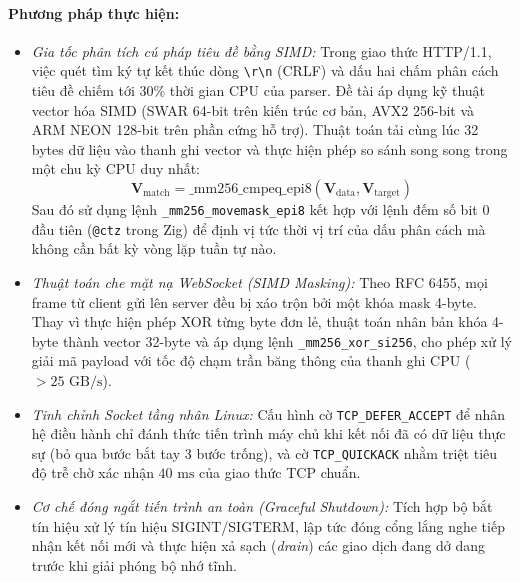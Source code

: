 \documentclass[letterpaper]{article}
\begin{document}
\paragraph{Phương pháp thực hiện:}
\begin{itemize}
    \item \textit{Gia tốc phân tích cú pháp tiêu đề bằng SIMD:} Trong giao thức HTTP/1.1, việc quét tìm ký tự kết thúc dòng \texttt{\textbackslash r\textbackslash n} (CRLF) và dấu hai chấm phân cách tiêu đề chiếm tới 30\% thời gian CPU của parser. Đề tài áp dụng kỹ thuật vector hóa SIMD (SWAR 64-bit trên kiến trúc cơ bản, AVX2 256-bit và ARM NEON 128-bit trên phần cứng hỗ trợ). Thuật toán tải cùng lúc 32 bytes dữ liệu vào thanh ghi vector và thực hiện phép so sánh song song trong một chu kỳ CPU duy nhất:
    \begin{equation}
        \mathbf{V}_{\text{match}} = \text{\_mm256\_cmpeq\_epi8}(\mathbf{V}_{\text{data}}, \mathbf{V}_{\text{target}})
    \end{equation}
    Sau đó sử dụng lệnh \texttt{\_mm256\_movemask\_epi8} kết hợp với lệnh đếm số bit 0 đầu tiên (\texttt{@ctz} trong Zig) để định vị tức thời vị trí của dấu phân cách mà không cần bất kỳ vòng lặp tuần tự nào.
    \item \textit{Thuật toán che mặt nạ WebSocket (SIMD Masking):} Theo RFC 6455, mọi frame từ client gửi lên server đều bị xáo trộn bởi một khóa mask 4-byte. Thay vì thực hiện phép XOR từng byte đơn lẻ, thuật toán nhân bản khóa 4-byte thành vector 32-byte và áp dụng lệnh \texttt{\_mm256\_xor\_si256}, cho phép xử lý giải mã payload với tốc độ chạm trần băng thông của thanh ghi CPU ($> 25\text{ GB/s}$).
    \item \textit{Tinh chỉnh Socket tầng nhân Linux:} Cấu hình cờ \texttt{TCP\_DEFER\_ACCEPT} để nhân hệ điều hành chỉ đánh thức tiến trình máy chủ khi kết nối đã có dữ liệu thực sự (bỏ qua bước bắt tay 3 bước trống), và cờ \texttt{TCP\_QUICKACK} nhằm triệt tiêu độ trễ chờ xác nhận $40\text{ ms}$ của giao thức TCP chuẩn.
    \item \textit{Cơ chế đóng ngắt tiến trình an toàn (Graceful Shutdown):} Tích hợp bộ bắt tín hiệu  xử lý tín hiệu SIGINT/SIGTERM, lập tức đóng cổng lắng nghe tiếp nhận kết nối mới và thực hiện xả sạch (\emph{drain}) các giao dịch đang dở dang trước khi giải phóng bộ nhớ tĩnh.
\end{itemize}
\end{document}
